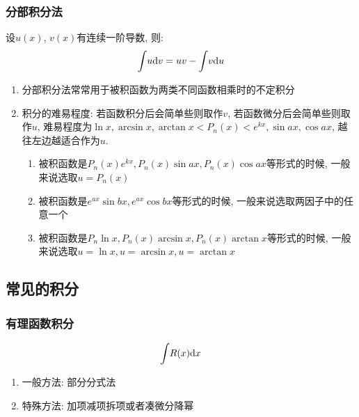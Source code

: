 \subsubsection{分部积分法}
设$ u(x) $, $ v(x) $有连续一阶导数, 则:
\begin{equation*}
\displaystyle\int_{}\hspace{.2em}u \mathrm{d}v=uv-\displaystyle\int_{}\hspace{.2em}v \mathrm{d}u
\end{equation*}
\begin{tcolorbox}
\begin{enumerate}
\item 分部积分法常常用于被积函数为两类不同函数相乘时的不定积分
\item 积分的难易程度: 若函数积分后会简单些则取作$ v $, 若函数微分后会简单些则取作$ u $, 难易程度为$ \ln x, \arcsin x, \arctan x<P_{n}(x)<e^{kx}, \sin ax, \cos ax $, 越往左边越适合作为$ u $.
\begin{enumerate}
\item 被积函数是$ P_{n}(x)e^{kx}, P_{n}(x)\sin ax, P_{n}(x)\cos ax $等形式的时候, 一般来说选取$ u=P_{n}(x) $
\item 被积函数是$ e^{ax}\sin bx, e^{ax}\cos bx $等形式的时候, 一般来说选取两因子中的任意一个
\item 被积函数是$ P_{n}\ln x, P_{n}(x)\arcsin x, P_{n}(x)\arctan x $等形式的时候, 一般来说选取$ u=\ln x, u=\arcsin x, u=\arctan x $
\end{enumerate}
\end{enumerate}
\end{tcolorbox}
\subsection{常见的积分}
\subsubsection{有理函数积分}
\begin{equation*}
\displaystyle\int_{}\hspace{.2em}R(x)\mathrm{d}x
\end{equation*}\par
\begin{enumerate}
\item 一般方法: 部分分式法
\item 特殊方法: 加项减项拆项或者凑微分降幂
\end{enumerate}

